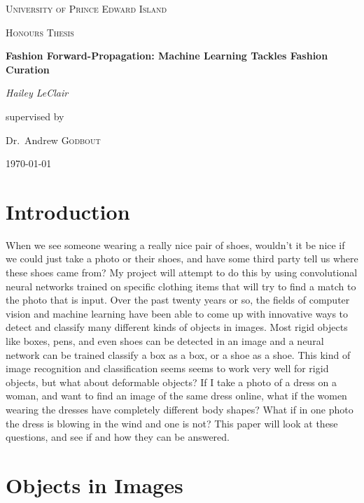 \documentclass[12pt]{article} %
\begin{document}
\begin{titlepage}
\centering
    {\scshape\LARGE University of Prince Edward Island\par}
    \vspace{1cm}
    {\scshape\Large Honours Thesis\par}
    \vspace{1.5cm}
    {\huge\bfseries Fashion Forward-Propagation: Machine Learning Tackles Fashion Curation\par}
    \vspace{2cm}
    {\Large\itshape Hailey LeClair\par}
    \vfill
    supervised by\par
    Dr.~Andrew \textsc{Godbout}

\vfill

\today\par

\end{titlepage}


\section{Introduction}


	When we see someone wearing a really nice pair of shoes, wouldn't it be nice if we could just take a photo or their shoes, and have some third party tell us where these shoes came from? My project will attempt to do this by using convolutional neural networks trained on specific clothing items that will try to find a match to the photo that is input. Over the past twenty years or so, the fields of computer vision and machine learning have been able to come up with innovative ways to detect and classify many different kinds of objects in images. Most rigid objects like boxes, pens, and even shoes can be detected in an image and a neural network can be trained classify a box as a box, or a shoe as a shoe. This kind of image recognition and classification seems seems to work very well for rigid objects, but what about deformable objects? If I take a photo of a dress on a woman, and want to find an image of the same dress online, what if the women wearing the dresses have completely different body shapes? What if in one photo the dress is blowing in the wind and one is not? This paper will look at these questions, and see if and how they can be answered. 
	
\section{Objects in Images}
\end{document}
